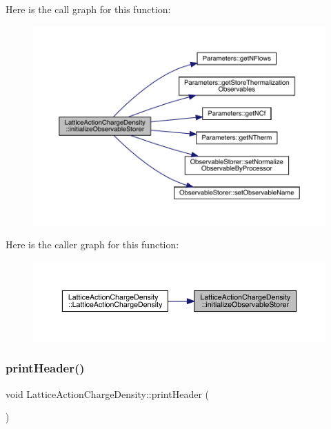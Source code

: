 Here is the call graph for this function\+:\nopagebreak
\begin{figure}[H]
\begin{center}
\leavevmode
\includegraphics[width=350pt]{class_lattice_action_charge_density_aba3131bbe5bd930adccc2852b4d44bb9_cgraph}
\end{center}
\end{figure}
Here is the caller graph for this function\+:\nopagebreak
\begin{figure}[H]
\begin{center}
\leavevmode
\includegraphics[width=350pt]{class_lattice_action_charge_density_aba3131bbe5bd930adccc2852b4d44bb9_icgraph}
\end{center}
\end{figure}
\mbox{\label{class_lattice_action_charge_density_a2a7a806862f23975161316a37f47f22e}} 
\subsubsection{\texorpdfstring{printHeader()}{printHeader()}}
{\footnotesize\ttfamily void Lattice\+Action\+Charge\+Density\+::print\+Header (\begin{DoxyParamCaption}{ }\end{DoxyParamCaption})\hspace{0.3cm}{\ttfamily [virtual]}}



